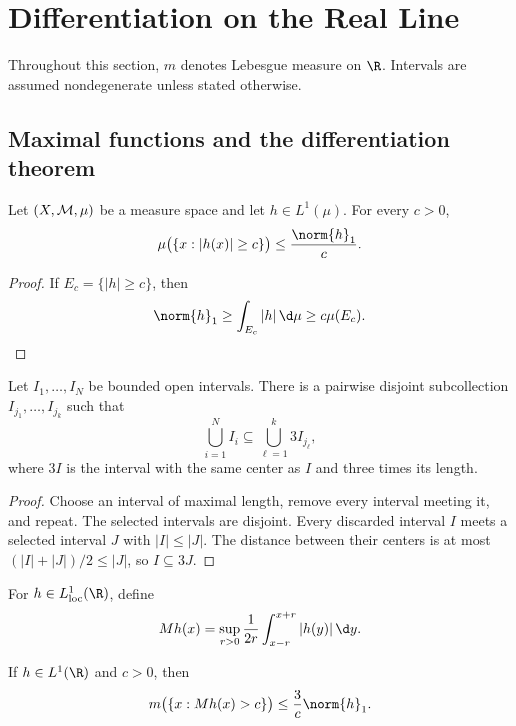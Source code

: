 \chapter{Differentiation on the Real Line}
\setcounter{section}{4}

Throughout this section, $m$ denotes Lebesgue measure on $\R$. Intervals are assumed nondegenerate unless stated otherwise.

\section{Maximal functions and the differentiation theorem}

\begin{prop}
Let $(X,\mathcal{M},\mu)$ be a measure space and let $h\in L^1(\mu)$. For every $c>0$,
\[
\mu\bigl(\{x:|h(x)|\geq c\}\bigr)\leq \frac{\norm{h}_1}{c}.
\]
\end{prop}

\begin{proof}
If $E_c=\{|h|\geq c\}$, then
\[
\norm{h}_1\geq \int_{E_c}|h|\,\d\mu\geq c\mu(E_c).
\]
\end{proof}

\begin{lem}
Let $I_1,\dots,I_N$ be bounded open intervals. There is a pairwise disjoint subcollection $I_{j_1},\dots,I_{j_k}$ such that
\[
\bigcup_{i=1}^N I_i\subseteq \bigcup_{\ell=1}^k 3I_{j_\ell},
\]
where $3I$ is the interval with the same center as $I$ and three times its length.
\end{lem}

\begin{proof}
Choose an interval of maximal length, remove every interval meeting it, and repeat. The selected intervals are disjoint. Every discarded interval $I$ meets a selected interval $J$ with $|I|\leq |J|$. The distance between their centers is at most $(|I|+|J|)/2\leq |J|$, so $I\subseteq 3J$.
\end{proof}

\begin{de}
For $h\in L^1_{\loc}(\R)$, define
\[
Mh(x)=\sup_{r>0}\frac{1}{2r}\int_{x-r}^{x+r}|h(y)|\,\d y.
\]
\end{de}

\begin{thm}
If $h\in L^1(\R)$ and $c>0$, then
\[
m\bigl(\{x:Mh(x)>c\}\bigr)\leq \frac{3}{c}\norm{h}_1.
\]
\end{thm}

